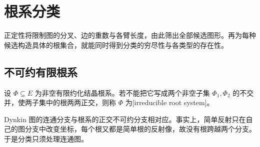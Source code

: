 
\section{根系分类}
\label{b5:sec:1703}

正定性将限制图的分叉、边的重数与各臂长度，由此筛出全部候选图形。再为每种候选构造具体的根集合，就能同时得到分类的穷尽性与各类型的存在性。


%
%

\subsection{不可约有限根系}
\label{b5:subsec:1703:01}

\begin{definition}\label{b5:def:irreducible-root-system}
	设 \(\Phi\subseteq E\) 为非空有限约化结晶根系。若不能把它写成两个非空子集 \(\Phi_1,\Phi_2\) 的不交并，使两子集中的根两两正交，则称 \(\Phi\) 为[irreducible root system]。
\end{definition}

Dynkin 图的连通分支与根系的正交不可约分支相对应。事实上，简单反射只在自己的图分支中改变坐标，每个根又都是简单根的反射像，故没有根跨越两个分支。于是分类只须处理连通图。

